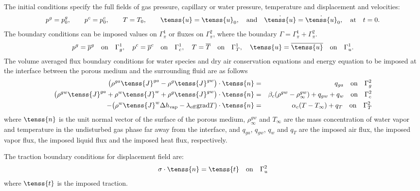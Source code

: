 The initial conditions specify the full fields of gas pressure, capillary or water pressure, 
temperature and displacement and velocities:
\begin{equation}\label{init}
p^g = p^g_0, \qquad p^c = p^c_0, \qquad T = T_0, \qquad \tenss{u} = \tenss{u}_0, 
\quad {\rm and}  \quad \dot{\tenss{u}} = \dot{\tenss{u}}_0, \quad {\rm at}\quad t = 0. 
\end{equation}
The boundary conditions can be imposed values on $\Gamma^1_{\pi}$ or fluxes on $\Gamma^2_{\pi}$, where the boundary
$\Gamma = \Gamma^1_{\pi} + \Gamma^2_{\pi}$.
\begin{equation}\label{bound1}
p^g = \overline{p}^g \quad {\rm on} \quad \Gamma^1_{g}, \quad p^c = \overline{p}^c \quad {\rm on} \quad \Gamma^1_{c},
\quad T = \overline{T} \quad {\rm on} \quad \Gamma^1_{T}, \quad \tenss{u} = \overline{\tenss{u}}  \quad {\rm on} \quad \Gamma^1_{u}.
\end{equation}
The volume averaged flux boundary conditions for water species and dry air conservation equations 
and energy equation to be imposed at the interface between the porous medium and the surrounding fluid are as follows
\begin{eqnarray}\label{bound2}
\big(\rho^{ga}\tenss{J}^{ga} - \rho^{g}\tenss{J}^{gw}\big)\cdot\tenss{n} &=& q_{ga} \quad {\rm on} \quad \Gamma^2_{g}\nonumber\\
\big(\rho^{gw}\tenss{J}^{ga} + \rho^{w}\tenss{J}^{w} + \rho^{g}\tenss{J}^{gw}\big)\cdot\tenss{n} &=& 
\beta_c(\rho^{gw} -\rho^{gw}_{\infty}) + q_{gw} + q_{w}\quad {\rm on} \quad \Gamma^2_{c}\\
-\big(\rho^{w}\tenss{J}^{w}\Delta h_{\rm vap} - \lambda_{\rm eff}{\rm grad}T)\cdot\tenss{n} &=& 
\alpha_c(T - T_{\infty}) + q_{T}\quad {\rm on} \quad \Gamma^2_{T}\nonumber
\end{eqnarray}
where $\tenss{n}$ is the unit normal vector of the surface of the porous medium, $\rho^{gw}_{\infty}$ and $T_{\infty}$ 
are the mass concentration of water vapor and temperature in the undisturbed gas phase far away from the interface, 
and $q_{ga}$, $q_{gw}$, $q_w$ and $q_T$ are the imposed air flux, the imposed vapor flux, the imposed liquid flux and 
the imposed heat flux, respectively.

The traction boundary conditions for displacement field are:
\begin{equation}\label{bound3}
\sigma\cdot\tenss{n} = \tenss{t} \quad {\rm on} \quad \Gamma^2_{u}
\end{equation}
where $\tenss{t}$ is the imposed traction.

